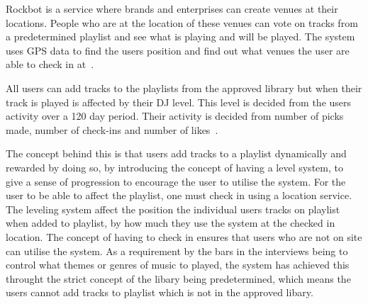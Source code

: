 Rockbot is a service where brands and enterprises can create venues at their locations. People who are at the location of these venues can vote on tracks from a predetermined playlist and see what is playing and will be played. The system uses GPS data to find the users position and find out what venues the user are able to check in at~\cite{rockbotFeatures}.

All users can add tracks to the playlists from the approved library but when their track is played is affected by their DJ level. This level is decided from the users activity over a 120 day period. Their activity is decided from number of picks made, number of check-ins and number of likes~\cite{rockbotBlog}.

The concept behind this is that users add tracks to a playlist dynamically and rewarded by doing so, by introducing the concept of having a level system, to give a sense of progression to encourage the user to utilise the system. For the user to be able to affect the playlist, one must check in using a location service. The leveling system affect the position the individual users tracks on playlist when added to playlist, by how much they use the system at the checked in location. The concept of having to check in ensures that users who are not on site can utilise the system.
As a requirement by the bars in the interviews being to control what themes or genres of music to played, the system has achieved this throught the strict concept of the libary being predetermined, which means the users cannot add tracks to playlist which is not in the approved libary.
